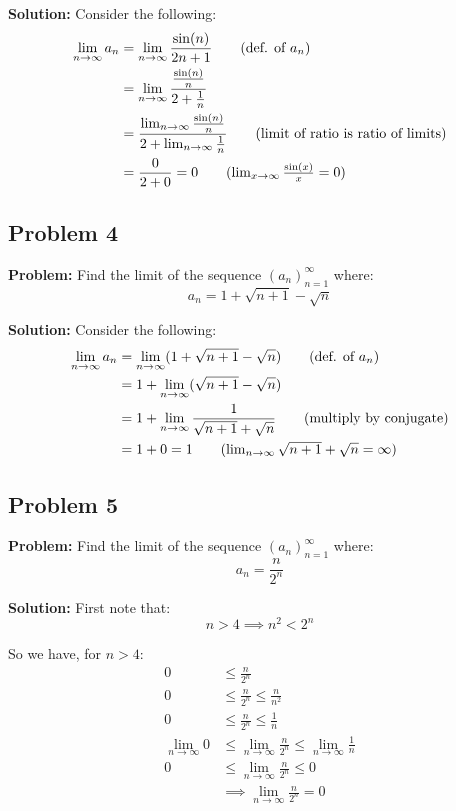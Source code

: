 \documentclass{article}
\begin{document}
\noindent\textbf{Solution:} Consider the following:
\begin{align*}
  \lim_{n\to\infty}a_n&=\lim_{n\to\infty}\frac{\sin(n)}{2n+1}\tag{def. of $a_n$}\\
  &=\lim_{n\to\infty}\frac{\frac{\sin(n)}{n}}{2+\frac{1}{n}}\\
  &=\frac{\lim_{n\to\infty}\frac{\sin(n)}{n}}{2+\lim_{n\to\infty}\frac{1}{n}}\tag{limit of ratio is ratio of limits}\\
  &=\frac{0}{2+0}=0\tag{$\lim_{x\to\infty}\frac{\sin(x)}{x}=0$}\\
\end{align*}

\subsection*{Problem 4}
\noindent\textbf{Problem:} Find the limit of the sequence $(a_n)_{n=1}^\infty$ where:
$$a_n=1+\sqrt{n+1}-\sqrt{n}$$

\noindent\textbf{Solution:} Consider the following:
\begin{align*}
  \lim_{n\to\infty}a_n&=\lim_{n\to\infty}(1+\sqrt{n+1}-\sqrt{n})\tag{def. of $a_n$}\\
  &=1+\lim_{n\to\infty}(\sqrt{n+1}-\sqrt{n})\\
  &=1+\lim_{n\to\infty}\frac{1}{\sqrt{n+1}+\sqrt{n}}\tag{multiply by conjugate}\\
  &=1+0=1\tag{$\lim_{n\to\infty}\sqrt{n+1}+\sqrt{n}=\infty$}
\end{align*}

\subsection*{Problem 5}
\noindent\textbf{Problem:} Find the limit of the sequence $(a_n)_{n=1}^\infty$ where:
$$a_n=\frac{n}{2^n}$$

\noindent\textbf{Solution:} First note that:
\begin{equation*}
  n>4\implies n^2<2^n\tag{lemma 1}
\end{equation*}

So we have, for $n>4$:
\begin{align*}
  0&\le\frac{n}{2^n}\tag{$n>0$}\\
  0&\le\frac{n}{2^n}\le\frac{n}{n^2}\tag{lemma 1, $n>4$}\\
  0&\le\frac{n}{2^n}\le\frac{1}{n}\\
  \lim_{n\to\infty}0&\le\lim_{n\to\infty}\frac{n}{2^n}\le\lim_{n\to\infty}\frac{1}{n}\tag{squeeze theorem}\\
  0&\le\lim_{n\to\infty}\frac{n}{2^n}\le0\\
  &\implies\lim_{n\to\infty}\frac{n}{2^n}=0
\end{align*}
\end{document}
